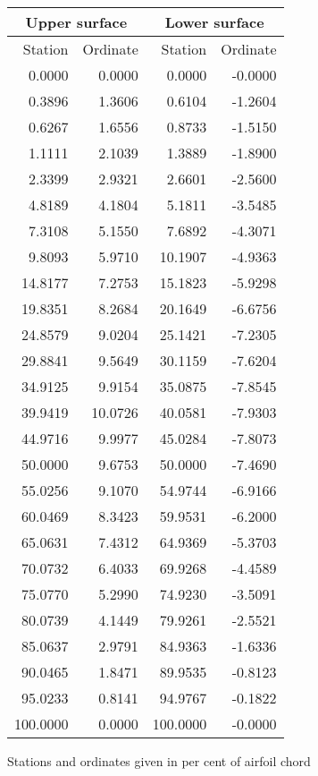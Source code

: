 \documentclass[11pt]{book}
\begin{document}
 \hspace{4mm}
 \begin{tabular}{|r|r|r|r|} \hline 
 \multicolumn{2}{|c|}{Upper surface} & \multicolumn{2}{|c|}{Lower surface} \\
 \hline
 Station & Ordinate & Station & Ordinate \\
 \hline
0.0000 & 0.0000 & 0.0000 & -0.0000 \\
0.3896 & 1.3606 & 0.6104 & -1.2604 \\
0.6267 & 1.6556 & 0.8733 & -1.5150 \\
1.1111 & 2.1039 & 1.3889 & -1.8900 \\
2.3399 & 2.9321 & 2.6601 & -2.5600 \\
4.8189 & 4.1804 & 5.1811 & -3.5485 \\
7.3108 & 5.1550 & 7.6892 & -4.3071 \\
9.8093 & 5.9710 & 10.1907 & -4.9363 \\
14.8177 & 7.2753 & 15.1823 & -5.9298 \\
19.8351 & 8.2684 & 20.1649 & -6.6756 \\
24.8579 & 9.0204 & 25.1421 & -7.2305 \\
29.8841 & 9.5649 & 30.1159 & -7.6204 \\
34.9125 & 9.9154 & 35.0875 & -7.8545 \\
39.9419 & 10.0726 & 40.0581 & -7.9303 \\
44.9716 & 9.9977 & 45.0284 & -7.8073 \\
50.0000 & 9.6753 & 50.0000 & -7.4690 \\
55.0256 & 9.1070 & 54.9744 & -6.9166 \\
60.0469 & 8.3423 & 59.9531 & -6.2000 \\
65.0631 & 7.4312 & 64.9369 & -5.3703 \\
70.0732 & 6.4033 & 69.9268 & -4.4589 \\
75.0770 & 5.2990 & 74.9230 & -3.5091 \\
80.0739 & 4.1449 & 79.9261 & -2.5521 \\
85.0637 & 2.9791 & 84.9363 & -1.6336 \\
90.0465 & 1.8471 & 89.9535 & -0.8123 \\
95.0233 & 0.8141 & 94.9767 & -0.1822 \\
100.0000 & 0.0000 & 100.0000 & -0.0000 \\
 \hline 
 \end{tabular}
 \vspace{8mm}

Stations and ordinates given in per cent of airfoil chord
\end{document}
